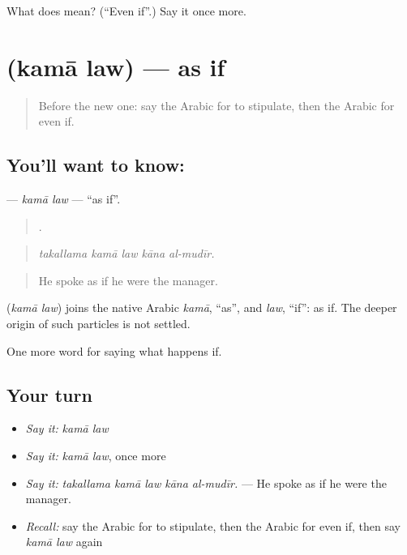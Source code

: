 \begin{tcolorbox}[breakable,colback=teal!4,colframe=teal!35!black,title={Before you move on}]
What does   mean? (\textquotedblleft{}Even if\textquotedblright{}.) Say it once more.
\end{tcolorbox}
\section[\texorpdfstring{\ar{كما} \ar{لو} (kamā law)}{كما لو (kamā law)}]{  (kamā law) — as if}

\label{lesson:AR-C404-kama-law}



\begin{quote}
Before the new one: say the Arabic for to stipulate, then the Arabic for even if.
\end{quote}

\subsection*{You'll want to know:  }
\textbf{ } — \emph{kamā law} — \textquotedblleft{}as if\textquotedblright{}.

\begin{quote}
    .
\end{quote}

\begin{quote}
\emph{takallama kamā law kāna al-mudīr.}
\end{quote}

\begin{quote}
He spoke as if he were the manager.
\end{quote}

\begin{cousinweb}
\textbf{ } (\emph{kamā law}) joins the native Arabic \emph{kamā}, \textquotedblleft{}as\textquotedblright{}, and \emph{law}, \textquotedblleft{}if\textquotedblright{}: as if. The deeper origin of such particles is not settled.
\end{cousinweb}

\begin{grammarlens}[title={What you've built}]
One more word for saying what happens if.
\end{grammarlens}

\subsection*{Your turn}
\begin{itemize}
\raggedright
  \item \emph{Say it:} \emph{kamā law}
  \item \emph{Say it:} \emph{kamā law}, once more
  \item \emph{Say it:} \emph{takallama kamā law kāna al-mudīr.} — He spoke as if he were the manager.
  \item \emph{Recall:} say the Arabic for to stipulate, then the Arabic for even if, then say \emph{kamā law} again
\end{itemize}

